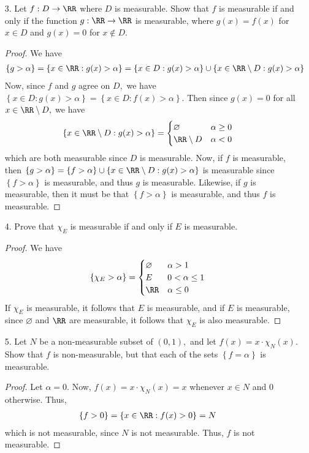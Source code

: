 \documentclass{article}
\begin{document}
\begin{itemize}
	\item[3.] Let $f:D\to\RR$ where $D$ is measurable. Show that $f$ is measurable if and only if the function $g:\RR\to\RR$ is measurable, where $g(x)=f(x)$ for $x\in D$ and $g(x)=0$ for $x\not\in D.$
		\begin{proof}
			We have
			\begin{align*}
				\left\{ g>\alpha \right\} = \left\{ x\in\RR: g(x)>\alpha \right\} &= \left\{ x\in D:g(x)>\alpha \right\} \cup \left\{ x\in \RR\setminus D: g(x)>\alpha \right\}
			\end{align*}
			Now, since $f$ and $g$ agree on $D,$ we have $\left\{ x\in D:g(x)>\alpha \right\} = \left\{ x\in D:f(x)>\alpha \right\}.$ Then since $g(x)=0$ for all $x\in\RR\setminus D,$ we have
			\begin{align*}
				\left\{ x\in\RR\setminus D:g(x)>\alpha \right\} &= \begin{cases}
					\varnothing & \alpha \ge 0 \\
					\RR\setminus D & \alpha < 0
				\end{cases}
			\end{align*}
			which are both measurable since $D$ is measurable. Now, if $f$ is measurable, then $\left\{ g>\alpha \right\} = \left\{ f>\alpha \right\} \cup \left\{ x\in\RR\setminus D: g(x)>\alpha \right\}$ is measurable since $\left\{ f>\alpha \right\}$ is measurable, and thus $g$ is measurable. Likewise, if $g$ is measurable, then it must be that $\left\{ f>\alpha \right\}$ is measurable, and thus $f$ is measurable.
		\end{proof}

	\item[4.] Prove that $\chi_E$ is measurable if and only if $E$ is measurable.
		\begin{proof}
			We have
			\begin{align*}
				\left\{ \chi_E>\alpha \right\} &= \begin{cases}
					\varnothing & \alpha > 1 \\
					E & 0< \alpha\le 1 \\
					\RR & \alpha \le 0
				\end{cases}
			\end{align*}
			If $\chi_E$ is measurable, it follows that $E$ is measurable, and if $E$ is measurable, since $\varnothing$ and $\RR$ are measurable, it follows that $\chi_E$ is also measurable.
		\end{proof}

	\item[5.] Let $N$ be a non-measurable subset of $(0, 1),$ and let $f(x)=x\cdot\chi_N(x).$ Show that $f$ is non-measurable, but that each of the sets $\left\{ f=\alpha \right\}$ is measurable.
		\begin{proof}
			Let $\alpha=0.$ Now, $f(x)=x\cdot \chi_N(x)=x$ whenever $x\in N$ and $0$ otherwise. Thus,
			\begin{align*}
				\left\{ f>0 \right\}=\left\{ x\in\RR: f(x)>0 \right\} &=  N
			\end{align*}
			which is not measurable, since $N$ is not measurable. Thus, $f$ is not measurable. 


\end{proof}
\end{itemize}
\end{document}
